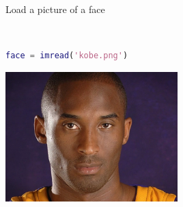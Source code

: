 Load a picture of a face

\begin{solution}\ 
    \begin{lstlisting}[language=Matlab]
    face = imread('kobe.png')
    \end{lstlisting}

    \begin{center}
        \includegraphics[width=0.5\textwidth]{img/e7p8a.png}
    \end{center}
\end{solution}